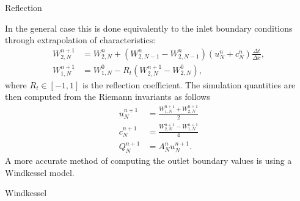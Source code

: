 \documentclass[a4paper, oneside]{discothesis}
\begin{document}
	Reflection

	In the general case this is done equivalently to the inlet boundary conditions through extrapolation of characteristics:
	\begin{align}
		W_{2,N}^{n+1}&=W_{2,N}^n+(W_{2,N-1}^n-W_{2,N-1}^n) (u_N^n+c_N^n) \frac{\Delta t}{\Delta x}, \\
		W_{1,N}^{n+1}&=W_{1,N}^0-R_t (W_{2,N}^{n+1}-W_{2,N}^0),
	\end{align}
	where $R_t \in [-1,1]$ is the reflection coefficient.
	The simulation quantities are then computed from the Riemann invariants as follows
	\begin{align}
		u_N^{n+1} &= \frac{W_{1,N}^{n+1} + W_{2,N}^{n+1}}{2} \\
		c_N^{n+1} &= \frac{W_{2,N}^{n+1} - W_{1,N}^{n+1}}{4} \\
		Q_N^{n+1} &= A_N^n u_N^{n+1}.
	\end{align}
	A more accurate method of computing the outlet boundary values is using a Windkessel model.


	Windkessel
\end{document}
